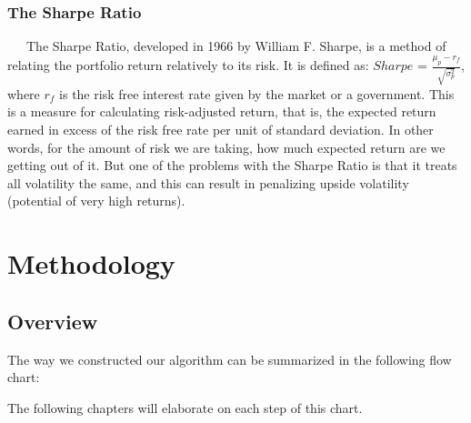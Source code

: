 \documentclass[12pt,titlepage,letter]{article}
\begin{document}
		\subsubsection{The Sharpe Ratio}
		\ \ \  The Sharpe Ratio, developed in 1966 by William F. Sharpe, is a method of relating the portfolio return relatively to its risk. It is defined as: $Sharpe$ = $\frac{\mu_p - r_f}{\sqrt{\sigma_p^2}}$, where $r_f$ is the risk free interest rate given by the market or a government.  This is a measure for calculating risk-adjusted return, that is, the expected return earned in excess of the risk free rate per unit of standard deviation. In other words, for the amount of risk we are taking, how much expected return are we getting out of it. But one of the problems with the Sharpe Ratio is that it treats all volatility the same, and this can result in penalizing upside volatility (potential of very high returns).\\

\newpage
\section{Methodology}
	\subsection{Overview}
		The way we constructed our algorithm can be summarized in the following flow chart:
		\begin{center}
		\end{center}
		The following chapters will elaborate on each step of this chart.
	
\end{document}
